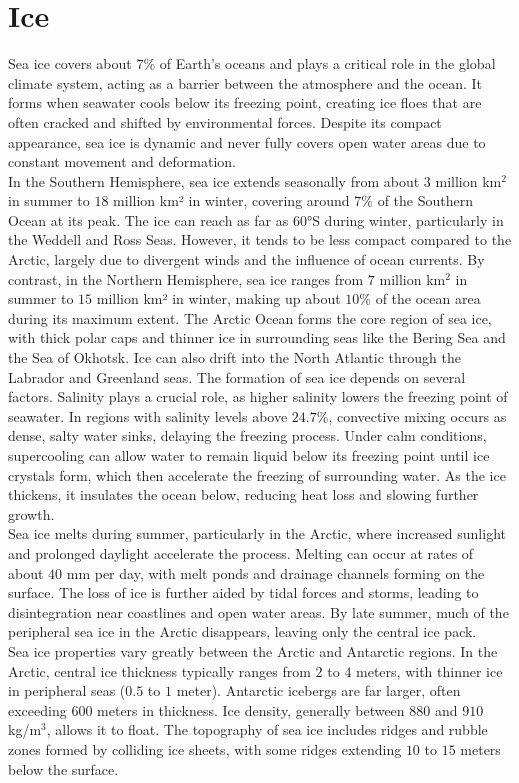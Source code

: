 \section{Ice}
Sea ice covers about $7$\% of Earth's oceans and plays a critical role in the global climate system, acting as a barrier between the atmosphere and the ocean. It forms when seawater cools below its freezing point, creating ice floes that are often cracked and shifted by environmental forces. Despite its compact appearance, sea ice is dynamic and never fully covers open water areas due to constant movement and deformation. \\
In the Southern Hemisphere, sea ice extends seasonally from about $3$ million km\(^2\) in summer to $18$ million km² in winter, covering around $7$\% of the Southern Ocean at its peak. The ice can reach as far as $60°$S during winter, particularly in the Weddell and Ross Seas. However, it tends to be less compact compared to the Arctic, largely due to divergent winds and the influence of ocean currents. By contrast, in the Northern Hemisphere, sea ice ranges from $7$ million km\(^2\) in summer to $15$ million km² in winter, making up about $10$\% of the ocean area during its maximum extent. The Arctic Ocean forms the core region of sea ice, with thick polar caps and thinner ice in surrounding seas like the Bering Sea and the Sea of Okhotsk. Ice can also drift into the North Atlantic through the Labrador and Greenland seas.
The formation of sea ice depends on several factors. Salinity plays a crucial role, as higher salinity lowers the freezing point of seawater. In regions with salinity levels above $24.7$\%, convective mixing occurs as dense, salty water sinks, delaying the freezing process. Under calm conditions, supercooling can allow water to remain liquid below its freezing point until ice crystals form, which then accelerate the freezing of surrounding water. As the ice thickens, it insulates the ocean below, reducing heat loss and slowing further growth. \\
Sea ice melts during summer, particularly in the Arctic, where increased sunlight and prolonged daylight accelerate the process. Melting can occur at rates of about $40$ mm per day, with melt ponds and drainage channels forming on the surface. The loss of ice is further aided by tidal forces and storms, leading to disintegration near coastlines and open water areas. By late summer, much of the peripheral sea ice in the Arctic disappears, leaving only the central ice pack. \\
Sea ice properties vary greatly between the Arctic and Antarctic regions. In the Arctic, central ice thickness typically ranges from $2$ to $4$ meters, with thinner ice in peripheral seas ($0.5$ to $1$ meter). Antarctic icebergs are far larger, often exceeding $600$ meters in thickness. Ice density, generally between $880$ and $910$ kg/m\(^3\), allows it to float. The topography of sea ice includes ridges and rubble zones formed by colliding ice sheets, with some ridges extending $10$ to $15$ meters below the surface. \\

